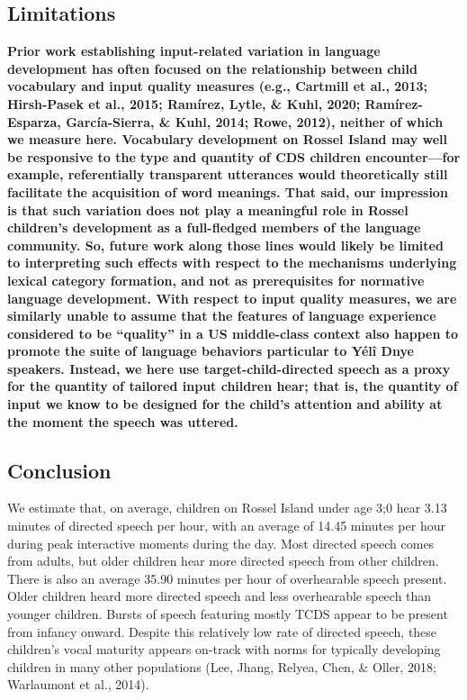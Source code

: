\documentclass[,man,floatsintext]{apa6}
\begin{document}
\subsection{\texorpdfstring{\textbf{Limitations}}{Limitations}}\label{limitations}

\textbf{Prior work establishing input-related variation in language
development has often focused on the relationship between child
vocabulary and input quality measures (e.g., Cartmill et al., 2013;
Hirsh-Pasek et al., 2015; Ramírez, Lytle, \& Kuhl, 2020;
Ramírez-Esparza, García-Sierra, \& Kuhl, 2014; Rowe, 2012), neither of
which we measure here. Vocabulary development on Rossel Island may well
be responsive to the type and quantity of CDS children encounter---for
example, referentially transparent utterances would theoretically still
facilitate the acquisition of word meanings. That said, our impression
is that such variation does not play a meaningful role in Rossel
children's development as a full-fledged members of the language
community. So, future work along those lines would likely be limited to
interpreting such effects with respect to the mechanisms underlying
lexical category formation, and not as prerequisites for normative
language development. With respect to input quality measures, we are
similarly unable to assume that the features of language experience
considered to be \enquote{quality} in a US middle-class context also
happen to promote the suite of language behaviors particular to Yélî
Dnye speakers. Instead, we here use target-child-directed speech as a
proxy for the quantity of tailored input children hear; that is, the
quantity of input we know to be designed for the child's attention and
ability at the moment the speech was uttered.}

\subsection{Conclusion}\label{disc-conclusion}

We estimate that, on average, children on Rossel Island under age 3;0
hear 3.13 minutes of directed speech per hour, with an average of 14.45
minutes per hour during peak interactive moments during the day. Most
directed speech comes from adults, but older children hear more directed
speech from other children. There is also an average 35.90 minutes per
hour of overhearable speech present. Older children heard more directed
speech and less overhearable speech than younger children. Bursts of
speech featuring mostly TCDS appear to be present from infancy onward.
Despite this relatively low rate of directed speech, these children's
vocal maturity appears on-track with norms for typically developing
children in many other populations (Lee, Jhang, Relyea, Chen, \& Oller,
2018; Warlaumont et al., 2014).
\end{document}

